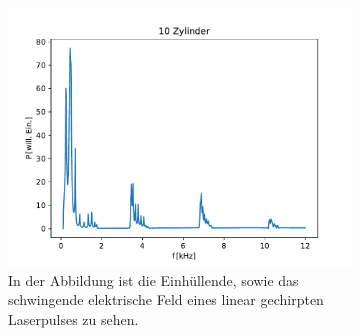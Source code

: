 \begin{figure}[ht]
                \centering
                \begin{subfigure}[b]{0.45\textwidth}
                    \centering
                    \includegraphics[scale=0.45]{./pictures/1dim_10_Zylinder_16mm.pdf}
                    \caption{In der Abbildung ist die Einhüllende, sowie das schwingende elektrische Feld eines linear gechirpten Laserpulses zu sehen.}
                    \label{fig:1dim_10_Zylinder_16mm}
                \end{subfigure}
                \caption{}
                \label{fig:jucktnicht}
            \end{figure}
            \FloatBarrier



